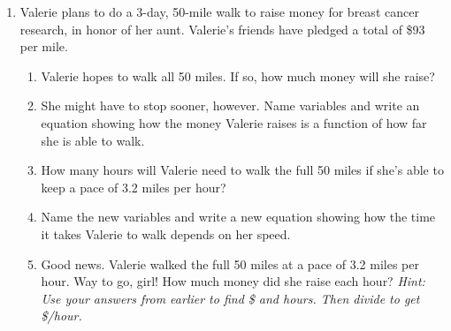\begin{enumerate}
\newpage %

\item Valerie plans to do a 3-day, 50-mile walk to raise money for breast cancer research, in honor of her aunt.  Valerie's friends have pledged a total of  \$93 per mile.   
\begin{enumerate}
\item Valerie hopes to walk all 50 miles.  If so, how much money will she raise? \vfill
\item She might have to stop sooner, however. Name variables and write an equation showing how the money Valerie raises is a function of how far she is able to walk.  \vfill \vfill
\item How many hours will Valerie need to walk the full 50 miles if she's able to keep a pace of 3.2 miles per hour?  \vfill
\item Name the new variables and write a new equation showing how the time it takes Valerie to walk depends on her speed.  \vfill \vfill
\item Good news.  Valerie walked the full 50 miles at a pace of 3.2 miles per hour.  Way to go, girl!   How much money did she raise each hour?  \emph{Hint:  Use your answers from earlier to find \$ and hours.  Then divide to get \$/hour.}  \vfill
\end{enumerate}

\end{enumerate}

